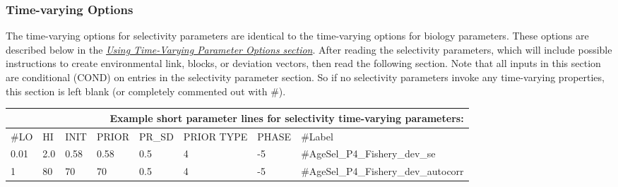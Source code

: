 \subsubsection{Time-varying Options}
The time-varying options for selectivity parameters are identical to the time-varying options for biology parameters.  These options are described below in the \hyperlink{TVpara}{\textit{Using Time-Varying Parameter Options section}}.  After reading the selectivity parameters, which will include possible instructions to create environmental link, blocks, or deviation vectors, then read the following section.  Note that all inputs in this section are conditional (COND) on entries in the selectivity parameter section.  So if no selectivity parameters invoke any time-varying properties, this section is left blank (or completely commented out with \#).

\begin{center}
	\begin{longtable}{p{0.8cm} p{0.8cm} p{1cm} p{0.8cm} p{1.75cm}p{1cm} p{1.2cm} p{5.2cm}}
		\multicolumn{8}{r}{Example short parameter lines for selectivity time-varying parameters:}\\
		\hline
		\#LO & HI & INIT & PRIOR & PR\_SD  & PRIOR TYPE & PHASE& \#Label \\
		\hline
		0.01 & 2.0 & 0.58 & 0.58 &  0.5  & 4 & -5 & \#AgeSel\_P4\_Fishery\_dev\_se \\
		1    & 80  & 70   & 70   &  0.5  & 4 & -5 & \#AgeSel\_P4\_Fishery\_dev\_autocorr \\
		\hline
	\end{longtable}
\end{center}

